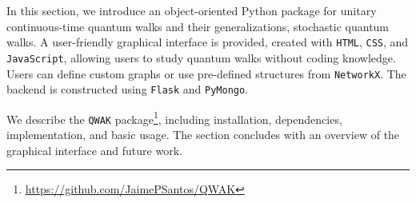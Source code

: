 \documentclass[../../dissertation.tex]{subfiles}
\begin{document}
In this section, we introduce an object-oriented Python package for unitary
continuous-time quantum walks and their generalizations, stochastic quantum
walks. A user-friendly graphical interface is provided, created with
\texttt{HTML}, \texttt{CSS}, and \texttt{JavaScript}, allowing users to study
quantum walks without coding knowledge. Users can define custom graphs or use
pre-defined structures from \texttt{NetworkX}. The backend is constructed using
\texttt{Flask} and \texttt{PyMongo}.\par

We describe the \texttt{QWAK}
package\footnote{\url{https://github.com/JaimePSantos/QWAK}}, including
installation, dependencies, implementation, and basic usage. The section
concludes with an overview of the graphical interface and future work.
\end{document}
